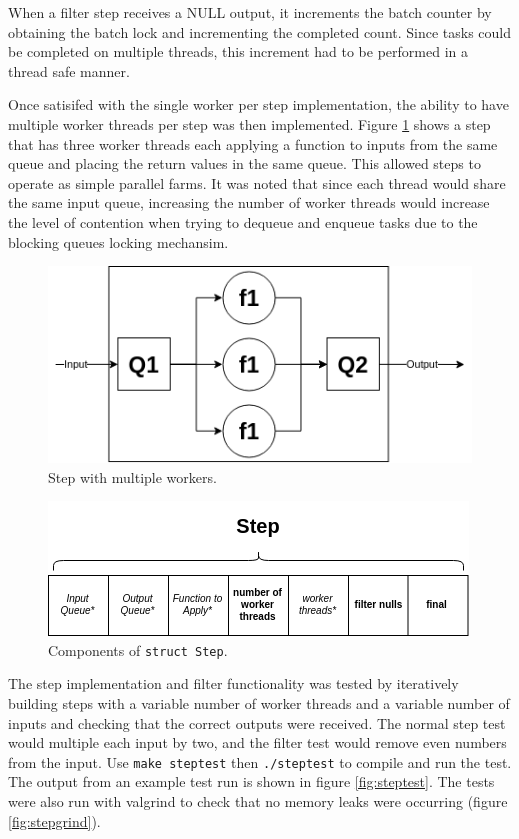 \documentclass[12pt]{article}
\def\code#1{\texttt{#1}}
\begin{document}
When a filter step receives a NULL output, it increments the batch counter by obtaining the batch lock and incrementing the completed count. Since tasks could be completed on multiple threads, this increment had to be performed in a thread safe manner.

Once satisifed with the single worker per step implementation, the ability to have multiple worker threads per step was then implemented. Figure \ref{fig:multiplestep} shows a step that has three worker threads each applying a function to inputs from the same queue and placing the return values in the same queue. This allowed steps to operate as simple parallel farms. It was noted that since each thread would share the same input queue, increasing the number of worker threads would increase the level of contention when trying to dequeue and enqueue tasks due to the blocking queues locking mechansim. 

\begin{figure}[!ht]
	\centering 
	\includegraphics[width=0.8\linewidth]{images/farm}
	\caption{Step with multiple workers.}
	\label{fig:multiplestep}
\end{figure}

\begin{figure}[!ht]
	\centering 
	\includegraphics[width=0.8\linewidth]{images/stepstruc}
	\caption{Components of \code{struct Step}.}
	\label{fig:stepstruc}
\end{figure}


The step implementation and filter functionality was tested by iteratively building steps with a variable number of worker threads and a variable number of inputs and checking that the correct outputs were received. The normal step test would multiple each input by two, and the filter test would remove even numbers from the input. Use \code{make steptest} then \code{./steptest} to compile and run the test. The output from an example test run is shown in figure \ref{fig:steptest}. The tests were also run with valgrind to check that no memory leaks were occurring (figure \ref{fig:stepgrind}).
\end{document}
